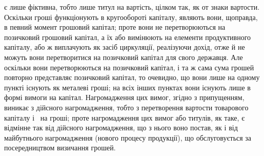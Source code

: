 \parcont{}  %
є лише фіктивна, тобто лише титул на вартість, цілком так, як от знаки
вартости. Оскільки гроші функціонують в кругообороті капіталу, являють вони,
щоправда, в певний момент грошовий капітал; проте вони не перетворюються на
позичковий грошовий капітал, а їх або вимінюють на елементи продуктивного капіталу,
або ж виплачують як засіб циркуляції, реалізуючи дохід, отже й не можуть
вони перетворитися на позичковий капітал для свого державця. Але оскільки
вони перетворюються на позичковий капітал, і та ж сама сума грошей повторно
представляє позичковий капітал, то очевидно, що вони лише на одному пункті
існують як металеві гроші; на всіх інших пунктах вони існують лише в формі
вимоги на капітал. Нагромадження цих вимог, згідно з припущенням, виникає
з дійсного нагромадження, тобто з перетворення вартости товарового капіталу
і~ на гроші; проте нагромадження цих вимог або титулів, як таке, є відмінне
так від дійсного нагромадження, що з нього воно постав, як і від майбутнього
нагромадження (нового процесу продукції), що обслуговується за посередництвом
визичання грошей.

